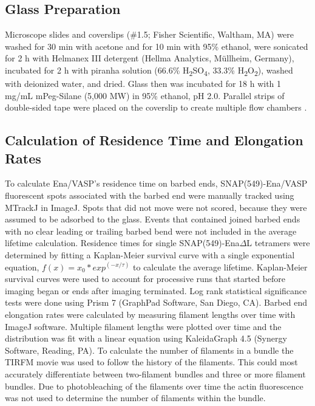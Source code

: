 \subsection{Glass Preparation}\label{ena-mm-glass}

Microscope slides and coverslips (\#1.5; Fisher Scientific, Waltham, MA) were washed for 30 min with acetone and for 10 min with 95\% ethanol, were sonicated for 2 h with Helmanex III detergent (Hellma Analytics, M\"ullheim, Germany), incubated for 2 h with piranha solution (66.6\% H\textsubscript{2}SO\textsubscript{4}, 33.3\% H\textsubscript{2}O\textsubscript{2}), washed with deionized water, and dried. Glass then was incubated for 18 h with 1 mg/mL mPeg-Silane (5,000 MW) in 95\% ethanol, pH 2.0. Parallel strips of double-sided tape were placed on the coverslip to create multiple flow chambers \citep{zimmermann_vitro_2016}. 

\subsection{Calculation of Residence Time and Elongation Rates}\label{ena-mm-resi-elong-measure}

To calculate Ena/VASP's residence time on barbed ends, SNAP(549)-Ena/VASP fluorescent spots associated with the barbed end were manually tracked using MTrackJ \citep{meijering_chapter_2012} in ImageJ. Spots that did not move were not scored, because they were assumed to be adsorbed to the glass. Events that contained joined barbed ends with no clear leading or trailing barbed bend were not included in the average lifetime calculation. Residence times for single SNAP(549)-Ena$\Delta$L tetramers were determined by fitting a Kaplan-Meier \citep{kaplan_nonparametric_1958} survival curve with a single exponential equation, $f(x) = x_{0} * exp^{(-x/\tau)}$ to calculate the average lifetime. Kaplan-Meier survival curves were used to account for processive runs that started before imaging began or ends after imaging terminated. Log rank statistical significance tests were done using Prism 7 (GraphPad Software, San Diego, CA). Barbed end elongation rates were calculated by measuring filament lengths over time with ImageJ software. Multiple filament lengths were plotted over time and the distribution was fit with a linear equation using KaleidaGraph 4.5 (Synergy Software, Reading, PA). To calculate the number of filaments in a bundle the TIRFM movie was used to follow the history of the filaments. This could most accurately differentiate between two-filament bundles and three or more filament bundles. Due to photobleaching of the filaments over time the actin fluorescence was not used to determine the number of filaments within the bundle.

